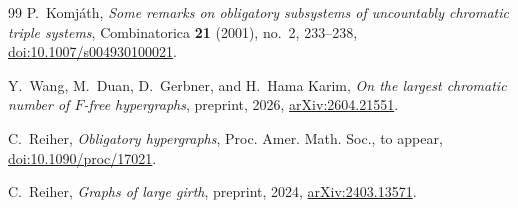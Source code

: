 \documentclass[11pt]{amsart}
\theoremstyle{definition}
\theoremstyle{remark}
\numberwithin{equation}{section}
\begin{document}
\begin{thebibliography}{99}
P.~Komj\'ath,
\emph{Some remarks on obligatory subsystems of uncountably chromatic
triple systems},
Combinatorica \textbf{21} (2001), no.~2, 233--238,
\href{https://doi.org/10.1007/s004930100021}{doi:10.1007/s004930100021}.

Y.~Wang, M.~Duan, D.~Gerbner, and H.~Hama Karim,
\emph{On the largest chromatic number of $F$-free hypergraphs},
preprint, 2026,
\href{https://arxiv.org/abs/2604.21551}{arXiv:2604.21551}.

C.~Reiher,
\emph{Obligatory hypergraphs},
Proc. Amer. Math. Soc., to appear,
\href{https://doi.org/10.1090/proc/17021}{doi:10.1090/proc/17021}.

C.~Reiher,
\emph{Graphs of large girth},
preprint, 2024,
\href{https://arxiv.org/abs/2403.13571}{arXiv:2403.13571}.

\end{thebibliography}
\end{document}
